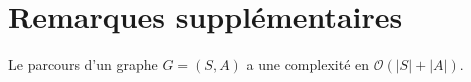 \section{Remarques supplémentaires}

Le parcours d'un graphe $G = (S, A)$\/ a une complexité en $\mathcal{O}(|S|+|A|)$.

